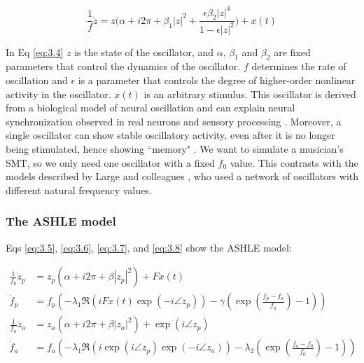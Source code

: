 \documentclass{report}
\begin{document}
\begin{equation}
\frac{1}{f}\dot{z} = z\bigg(\alpha + i2\pi + \beta_1|z|^2 + \frac{\epsilon\beta_2|z|^4}{1-\epsilon|z|^2}\bigg) + x(t) \label{eq:3.4}
\end{equation}

In Eq \eqref{eq:3.4} $z$ is the state of the oscillator, and $\alpha$, $\beta_1$ and $\beta_2$ are fixed parameters that control the dynamics of the oscillator. $f$ determines the rate of oscillation and $\epsilon$ is a parameter that controls the degree of higher-order nonlinear activity in the oscillator. $x(t)$ is an arbitrary stimulus. This oscillator is derived from a biological model of neural oscillation and can explain neural synchronization observed in real neurons and sensory processing \cite{lerud2019canonical, tal2017neural}. Moreover, a single oscillator can show stable oscillatory activity, even after it is no longer being stimulated, hence showing ``memory" \cite{kim2015signal}. We want to simulate a musician's SMT, so we only need one oscillator with a fixed $f_0$ value. This contrasts with the models described by Large and colleagues \cite{large2010canonical}, who used a network of oscillators with different natural frequency values.

\subsubsection{The ASHLE model}

Eqs \eqref{eq:3.5}, \eqref{eq:3.6}, \eqref{eq:3.7}, and \eqref{eq:3.8} show the ASHLE model:

\begin{subequations}
\begin{align}
\frac{1}{f_p}\dot{z}_p &= z_p\left( \alpha + i2\pi + \beta|z_p|^2 \right) + Fx(t) \label{eq:3.5} \\
\dot{f}_p &= f_p \left(-\lambda_1\Re\left( iFx(t)\exp(-i\angle z_p) \right) - \gamma\left( \exp\left(\frac{f_p-f_a}{f_a}\right)-1 \right) \right) \label{eq:3.6} \\
\frac{1}{f_a}\dot{z}_a &= z_a \left( \alpha + i2\pi + \beta|z_a|^2 \right) + \exp(i \angle z_p) \label{eq:3.7} \\
\dot{f}_a &= f_a \left( -\lambda_1\Re \left( i\exp(i \angle z_p)\exp(-i\angle z_a) \right) - \lambda_2 \left( \exp\left(\frac{f_a-f_0}{f_0}\right)-1 \right) \right) \label{eq:3.8}
\end{align}
\end{subequations}
\end{document}
